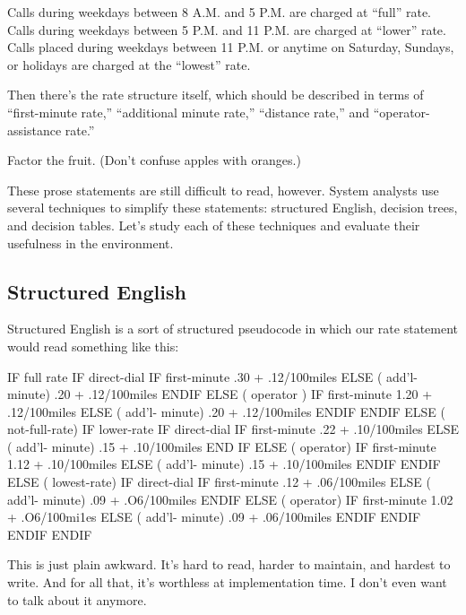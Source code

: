 \begin{tfquot}
Calls during weekdays between 8 A.M. and 5 P.M. are charged at ``full'' rate.
Calls during weekdays between 5 P.M. and 11 P.M. are charged at ``lower''
rate. Calls placed during weekdays between 11 P.M. or anytime on Saturday,
Sundays, or holidays are charged at the ``lowest'' rate.
\end{tfquot}
Then there's the rate structure itself, which should be described in
terms of ``first-minute rate,'' ``additional minute rate,'' ``distance
rate,'' and ``operator-assistance rate.''

\begin{tip}
Factor the fruit. (Don't confuse apples with oranges.)
\end{tip}
These prose statements are still difficult to read, however. System
analysts use several techniques to simplify these statements:
structured English, decision trees, and decision tables. Let's study
each of these techniques and evaluate their usefulness in the \Forth{}
environment.

\subsection{Structured English}%
%

Structured English is a sort of structured pseudocode in which our rate
statement would read something like this:

\begin{Code}[baselinestretch=0.95]
IF full rate
   IF direct-dial
      IF first-minute
	 .30 + .12/100miles
      ELSE ( add'l- minute)
	 .20 + .12/100miles
      ENDIF
   ELSE ( operator )
      IF first-minute
	 1.20 + .12/100miles
      ELSE ( add'l- minute)
	 .20 + .12/100miles
      ENDIF
   ENDIF
ELSE  ( not-full-rate)
   IF lower-rate
      IF direct-dial
	 IF first-minute
	    .22 + .10/100miles
	 ELSE ( add'l- minute)
	    .15 + .10/100miles
	 END IF
      ELSE ( operator)
	 IF first-minute
	    1.12 + .10/100miles
	 ELSE ( add'l- minute)
	    .15 + .10/100miles
	 ENDIF
      ENDIF
   ELSE ( lowest-rate)
      IF direct-dial
	 IF first-minute
	    .12 + .06/100miles
	 ELSE ( add'l- minute)
	    .09 + .O6/100miles
	 ENDIF
      ELSE ( operator)
	 IF first-minute
	    1.02 + .O6/100mi1es
	 ELSE ( add'l- minute)
	    .09 + .06/100miles
	 ENDIF
      ENDIF
   ENDIF
ENDIF
\end{Code}
This is just plain awkward. It's hard to read, harder to maintain, and
hardest to write. And for all that, it's worthless at implementation
time. I don't even want to talk about it anymore.%
%

